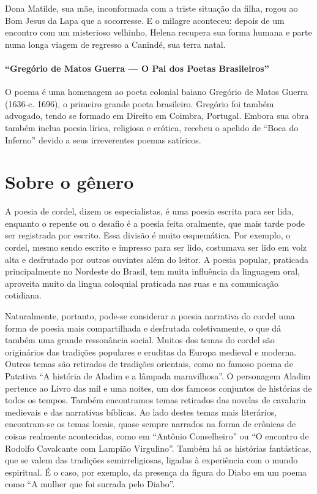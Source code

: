 Dona Matilde, sua mãe, inconformada com a triste situação da filha,
rogou ao Bom Jesus da Lapa que a socorresse. E o milagre aconteceu:
depois de um encontro com um misterioso velhinho, Helena recupera sua
forma humana e parte numa longa viagem de regresso a Canindé, sua terra
natal. 

\paragraph{“Gregório de Matos Guerra — O Pai dos Poetas Brasileiros”}

O poema é uma homenagem ao poeta colonial baiano Gregório de Matos
Guerra (1636-c. 1696), o primeiro grande poeta brasileiro. Gregório foi
também advogado, tendo se formado em Direito em Coimbra, Portugal.
Embora sua obra também inclua poesia lírica, religiosa e erótica,
recebeu o apelido de “Boca do Inferno” devido a seus irreverentes
poemas satíricos.

\section{Sobre o gênero} 

A poesia de cordel, dizem os especialistas, é uma poesia escrita para ser lida,
enquanto o repente ou o desafio é a poesia feita oralmente, que mais tarde pode
ser registrada por escrito. Essa divisão é muito esquemática. Por exemplo, o
cordel, mesmo sendo escrito e impresso para ser lido, costumava ser lido em
volz alta e desfrutado por outros ouvintes além do leitor. A poesia popular,
praticada principalmente no Nordeste do Brasil, tem muita influência da
linguagem oral, aproveita muito da língua coloquial praticada nas ruas e na
comunicação cotidiana. 

Naturalmente, portanto, pode-se considerar a poesia narrativa do cordel uma
forma de poesia mais compartilhada e desfrutada coletivamente, o que dá também
uma grande ressonância social. Muitos dos temas do cordel são originários das
tradições populares e eruditas da Europa medieval e moderna. Outros temas são
retirados de tradições orientais, como no famoso poema de Patativa “A história de
Aladim e a lâmpada maravilhosa”. O personagem Aladim pertence ao Livro das mil
e uma noites, um dos famosos conjuntos de histórias de todos os tempos. Também
encontramos temas retirados das novelas de cavalaria medievais e das narrativas
bíblicas. Ao lado destes temas mais literários, encontram-se os temas locais,
quase sempre narrados na forma de crônicas de coisas realmente acontecidas,
como em “Antônio Conselheiro” ou ``O encontro de Rodolfo Cavalcante com Lampião Virgulino''. Também há as histórias fantásticas, que se valem das tradições semirreligiosas, ligadas à experiência com o mundo espiritual. É o caso, por exemplo, da presença da figura do Diabo em um poema como ``A mulher que foi surrada pelo Diabo''.

